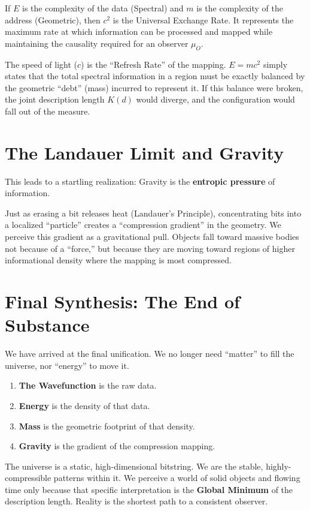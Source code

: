 If $E$ is the complexity of the data (Spectral) and $m$ is the complexity of the address (Geometric), then $c^2$ is the Universal Exchange Rate. It represents the maximum rate at which information can be processed and mapped while maintaining the causality required for an observer $\mu_O$.

The speed of light ($c$) is the ``Refresh Rate'' of the mapping. $E=mc^2$ simply states that the total spectral information in a region must be exactly balanced by the geometric ``debt'' (mass) incurred to represent it. If this balance were broken, the joint description length $K(d)$ would diverge, and the configuration would fall out of the measure.

\section{The Landauer Limit and Gravity}

This leads to a startling realization: Gravity is the \textbf{entropic pressure} of information.

Just as erasing a bit releases heat (Landauer's Principle), concentrating bits into a localized ``particle'' creates a ``compression gradient'' in the geometry. We perceive this gradient as a gravitational pull. Objects fall toward massive bodies not because of a ``force,'' but because they are moving toward regions of higher informational density where the mapping is most compressed.

\section{Final Synthesis: The End of Substance}

We have arrived at the final unification. We no longer need ``matter'' to fill the universe, nor ``energy'' to move it.

\begin{enumerate}
\item \textbf{The Wavefunction} is the raw data.
\item \textbf{Energy} is the density of that data.
\item \textbf{Mass} is the geometric footprint of that density.
\item \textbf{Gravity} is the gradient of the compression mapping.
\end{enumerate}

The universe is a static, high-dimensional bitstring. We are the stable, highly-compressible patterns within it. We perceive a world of solid objects and flowing time only because that specific interpretation is the \textbf{Global Minimum} of the description length. Reality is the shortest path to a consistent observer.

